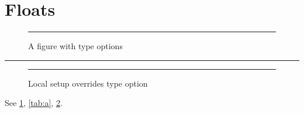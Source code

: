 \documentclass{article}
\begin{document}
\listoffigures
\listoftables
\section{Floats}
\begin{figure}[htbp]
\centering\rule{3cm}{1cm}
\caption{A figure with type options}\label{fig:a}
\end{figure}
\begin{table}[htbp]
\caption{A table with type options}\label{tab:a}
\centering\rule{3cm}{1cm}
\end{table}
\begin{figure}[htbp]
\captionsetup{labelfont=it}
\centering\rule{3cm}{1cm}
\caption{Local setup overrides type option}\label{fig:b}
\end{figure}
See \ref{fig:a}, \ref{tab:a}, \ref{fig:b}.
\end{document}
